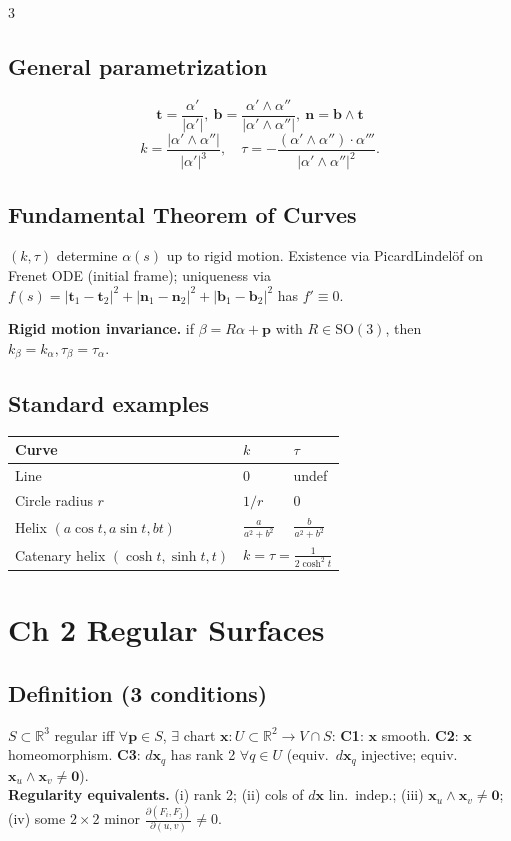 \documentclass[9pt,a4paper]{extarticle}
\newcommand{\thm}[1]{\textbf{#1.}}
\newcommand{\R}{\mathbb{R}}
\newcommand{\bt}{\mathbf{t}}
\newcommand{\bn}{\mathbf{n}}
\newcommand{\bb}{\mathbf{b}}
\newcommand{\bx}{\mathbf{x}}
\newcommand{\bp}{\mathbf{p}}
\newcommand{\xu}{\bx_u}
\newcommand{\xv}{\bx_v}
\begin{document}
\begin{multicols*}{3}
\subsection{General parametrization}
\[
\bt=\frac{\alpha'}{|\alpha'|},\ \bb=\frac{\alpha'\wedge\alpha''}{|\alpha'\wedge\alpha''|},\ \bn=\bb\wedge\bt
\]
\[
k=\frac{|\alpha'\wedge\alpha''|}{|\alpha'|^3},\quad
\tau=-\frac{(\alpha'\wedge\alpha'')\cdot\alpha'''}{|\alpha'\wedge\alpha''|^2}.
\]

\subsection{Fundamental Theorem of Curves}
$(k,\tau)$ determine $\alpha(s)$ up to rigid motion. Existence via Picard\textendash Lindel\"of on Frenet ODE (initial frame); uniqueness via $f(s)=|\bt_1\!-\!\bt_2|^2+|\bn_1\!-\!\bn_2|^2+|\bb_1\!-\!\bb_2|^2$ has $f'\equiv 0$.

\thm{Rigid motion invariance} if $\beta=R\alpha+\bp$ with $R\in\mathrm{SO}(3)$, then $k_\beta=k_\alpha,\tau_\beta=\tau_\alpha$.

\subsection{Standard examples}
\begin{tabular}{@{}lll@{}}
\toprule
Curve & $k$ & $\tau$\\
\midrule
Line & 0 & undef\\
Circle radius $r$ & $1/r$ & 0\\
Helix $(a\cos t,a\sin t,bt)$ & $\frac{a}{a^2+b^2}$ & $\frac{b}{a^2+b^2}$\\
Catenary helix $(\cosh t,\sinh t,t)$ & \multicolumn{2}{l}{$k=\tau=\frac{1}{2\cosh^2 t}$}\\
\bottomrule
\end{tabular}

\section{Ch 2 \textemdash{} Regular Surfaces}

\subsection{Definition (3 conditions)}
$S\subset\R^3$ regular iff $\forall \bp\in S$, $\exists$ chart $\bx:U\subset\R^2\to V\cap S$:
\textbf{C1}: $\bx$ smooth.\quad
\textbf{C2}: $\bx$ homeomorphism.\quad
\textbf{C3}: $d\bx_q$ has rank 2 $\forall q\in U$ (equiv.\ $d\bx_q$ injective; equiv.\ $\xu\wedge\xv\ne\mathbf{0}$).\\
\thm{Regularity equivalents} (i) rank 2; (ii) cols of $d\bx$ lin.\ indep.; (iii) $\xu\wedge\xv\ne\mathbf{0}$; (iv) some $2\!\times\!2$ minor $\frac{\partial(F_i,F_j)}{\partial(u,v)}\ne 0$.


\end{multicols*}
\end{document}
